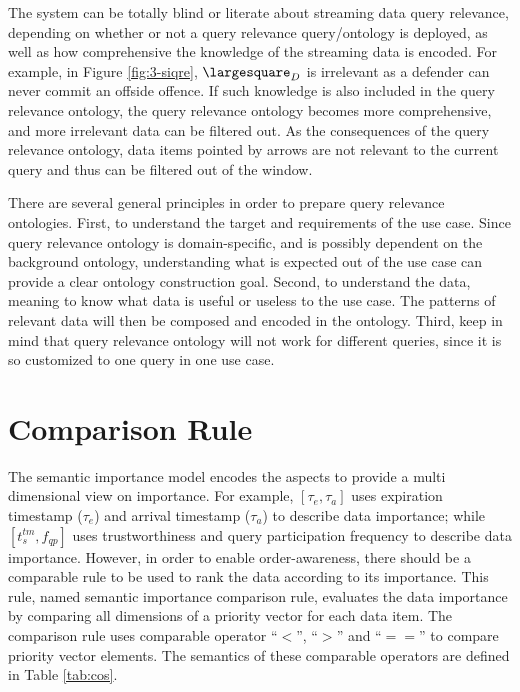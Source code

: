 The system can be totally blind or literate about streaming data query relevance, depending on whether or not a query relevance query/ontology is deployed, as well as how comprehensive the knowledge of the streaming data is encoded. 
For example, in Figure \ref{fig:3-siqre}, $\largesquare_{D}$ is irrelevant as a defender can never commit an offside offence. 
If such knowledge is also included in the query relevance ontology, the query relevance ontology becomes more comprehensive, and more irrelevant data can be filtered out. 
As the consequences of the query relevance ontology, data items pointed by arrows are not relevant to the current query and thus can be filtered out of the window.


There are several general principles in order to prepare query relevance ontologies.
First, to understand the target and requirements of the use case. 
Since query relevance ontology is domain-specific, and is possibly dependent on the background ontology, understanding what is expected out of the use case can provide a clear ontology construction goal. 
Second, to understand the data, meaning to know what data is useful or useless to the use case.
The patterns of relevant data will then be composed and encoded in the ontology.
Third, keep in mind that query relevance ontology will not work for different queries, since it is so customized to one query in one use case.
%
\section{Comparison Rule}
The semantic importance model encodes the aspects to provide a multi dimensional view on importance.
For example, $[\tau_{e}, \tau_{a}]$ uses expiration timestamp ($\tau_{e}$) and arrival timestamp ($\tau_{a}$) to describe data importance; while $[t^{tm}_{s}, f_{qp}]$ uses trustworthiness and query participation frequency to describe data importance. 
However, in order to enable order-awareness, there should be a comparable rule to be used to rank the data according to its importance. 
This rule, named semantic importance comparison rule, evaluates the data importance by comparing all dimensions of a priority vector for each data item. 
The comparison rule uses comparable operator ``$<$'', ``$>$'' and ``$==$'' to compare priority vector elements. 
The semantics of these comparable operators are defined in Table \ref{tab:cos}.

